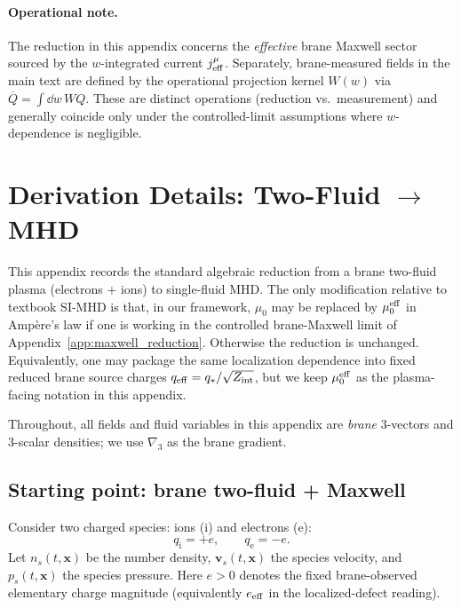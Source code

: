 \documentclass[11pt]{article}
\newcommand{\gradthree}{\nabla_3}
\newcommand{\ion}{\mathrm{i}}
\newcommand{\ele}{\mathrm{e}}
\newcommand{\Zint}{Z_{\rm int}}
\begin{document}
\paragraph{Operational note.}
The reduction in this appendix concerns the \emph{effective} brane Maxwell sector sourced by the
\(w\)-integrated current \(j_{\rm eff}^\mu\). Separately, brane-measured fields in the main text
are defined by the operational projection kernel \(W(w)\) via \(\overline{Q}=\int \dd w\,WQ\).
These are distinct operations (reduction vs.\ measurement) and generally coincide only under the
controlled-limit assumptions where \(w\)-dependence is negligible.

\section{Derivation Details: Two-Fluid \texorpdfstring{$\to$}{->} MHD}
\label{app:twofluid_to_mhd}

This appendix records the standard algebraic reduction from a brane two-fluid plasma
(electrons + ions) to single-fluid MHD. The only modification relative to textbook
SI-MHD is that, in our framework, \(\mu_0\) may be replaced by \(\mu_0^{\rm eff}\)
in Amp\`ere's law if one is working in the controlled brane-Maxwell limit of
Appendix~\ref{app:maxwell_reduction}. Otherwise the reduction is unchanged.
Equivalently, one may package the same localization dependence into fixed reduced
brane source charges \(q_{\rm eff}=q_*/\sqrt{\Zint}\), but we keep
\(\mu_0^{\rm eff}\) as the plasma-facing notation in this appendix.

Throughout, all fields and fluid variables in this appendix are \emph{brane} \(3\)-vectors
and \(3\)-scalar densities; we use \(\gradthree\) as the brane gradient.

\subsection{Starting point: brane two-fluid + Maxwell}
\label{app:twofluid_start}

Consider two charged species: ions (\(\ion\)) and electrons (\(\ele\)):
\begin{equation}
q_\ion = +e,\qquad q_\ele=-e.
\end{equation}
Let \(n_s(t,\mathbf{x})\) be the number density, \(\mathbf{v}_s(t,\mathbf{x})\) the
species velocity, and \(p_s(t,\mathbf{x})\) the species pressure.
Here \(e>0\) denotes the fixed brane-observed elementary charge magnitude
(equivalently \(e_{\rm eff}\) in the localized-defect reading).
\end{document}
